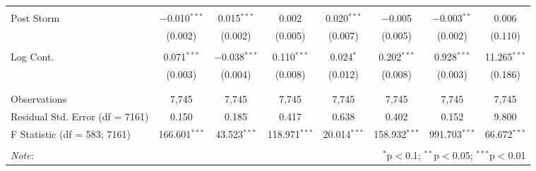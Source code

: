 \begin{table}[!htbp]
\begin{tabular}{@{\extracolsep{5pt}}lccccccc}
  & & & & & & & \\ 
 Post Storm & $-$0.010$^{***}$ & 0.015$^{***}$ & 0.002 & 0.020$^{***}$ & $-$0.005 & $-$0.003$^{**}$ & 0.006 \\ 
  & (0.002) & (0.002) & (0.005) & (0.007) & (0.005) & (0.002) & (0.110) \\ 
  & & & & & & & \\ 
 Log Cont. & 0.071$^{***}$ & $-$0.038$^{***}$ & 0.110$^{***}$ & 0.024$^{*}$ & 0.202$^{***}$ & 0.928$^{***}$ & 11.265$^{***}$ \\ 
  & (0.003) & (0.004) & (0.008) & (0.012) & (0.008) & (0.003) & (0.186) \\ 
  & & & & & & & \\ 
\hline \\[-1.8ex] 
Observations & 7,745 & 7,745 & 7,745 & 7,745 & 7,745 & 7,745 & 7,745 \\ 
Residual Std. Error (df = 7161) & 0.150 & 0.185 & 0.417 & 0.638 & 0.402 & 0.152 & 9.800 \\ 
F Statistic (df = 583; 7161) & 166.601$^{***}$ & 43.523$^{***}$ & 118.971$^{***}$ & 20.014$^{***}$ & 158.932$^{***}$ & 991.703$^{***}$ & 66.672$^{***}$ \\ 
\hline 
\hline \\[-1.8ex] 
\textit{Note:}  & \multicolumn{7}{r}{$^{*}$p$<$0.1; $^{**}$p$<$0.05; $^{***}$p$<$0.01} \\ 
\end{tabular} 
\end{table} 
